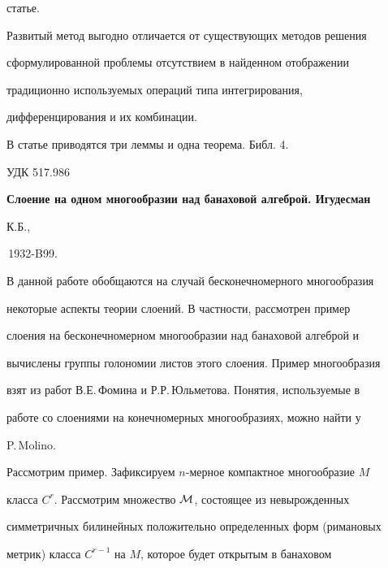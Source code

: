 статье. 


 


Развитый метод выгодно отличается от существующих методов решения 


сформулированной проблемы отсутствием в найденном отображении 


традиционно используемых операций типа интегрирования, 


дифференцирования и их комбинации. 


 


В статье приводятся три леммы и одна теорема. Библ. 4. 


\bigskip 


 


 


{\hfill {УДК 517.986}} 


 


{\bf Слоение на одном многообразии над банаховой алгеброй. Игудесман 


К.Б., 


\No\,1932-B99.} 


\medskip 


 


В данной работе обобщаются на случай бесконечномерного многообразия 


некоторые аспекты теории слоений. В частности, рассмотрен пример 


слоения на бесконечномерном многообразии над банаховой алгеброй и 


вычислены группы голономии листов этого слоения. Пример многообразия 


взят из работ В.Е.\,Фомина и Р.Р.\,Юльметова. Понятия, используемые в 


работе со слоениями на конечномерных многообразиях, можно найти у 


P.\,Molino. 


 


Рассмотрим пример. Зафиксируем $n$-мерное компактное многообразие $M$ 


класса $C^r$. Рассмотрим множество $\cal M$, состоящее из невырожденных 


симметричных билинейных положительно определенных форм (римановых 


метрик) класса $C^{r-1}$ на $M$, которое будет открытым в банаховом 


